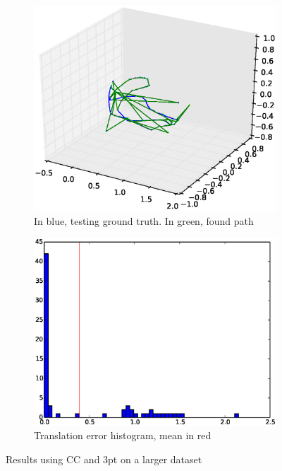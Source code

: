 \begin{figure}[htpb]
  \begin{subfigure}[b]{6cm}
          \includegraphics[width=\linewidth]{img/large_desktop/CC_3pt_path.eps}
          \caption{In blue, testing ground truth. In green, found path}                
          \label{fig:desktop_2_ferns_path_1}
  \end{subfigure}   
  \qquad
  \begin{subfigure}[b]{6cm}
          \includegraphics[width=\linewidth]{img/large_desktop/CC_3pt_dist.eps}
          \caption{Translation error histogram, mean in red} 
          \label{fig:desktop_2_ferns_dist_1}
  \end{subfigure}
  \caption{Results using CC and 3pt on a larger dataset}
\end{figure}


